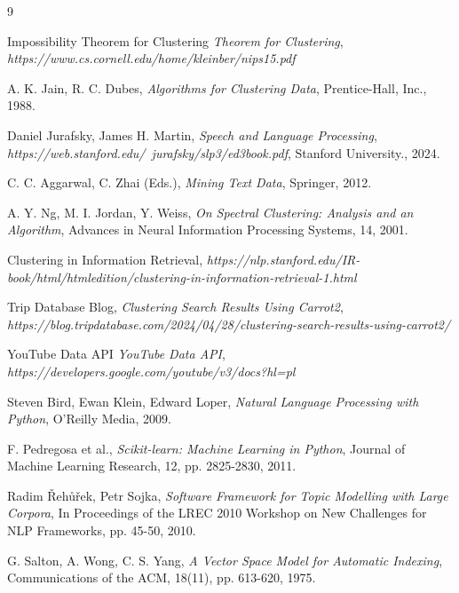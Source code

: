 \begin{thebibliography}{9}
\small


Impossibility Theorem for Clustering
\emph{Theorem for Clustering}, \emph{https://www.cs.cornell.edu/home/kleinber/nips15.pdf}

A. K. Jain, R. C. Dubes, \emph{Algorithms for Clustering Data}, Prentice-Hall, Inc., 1988.

Daniel Jurafsky, James H. Martin, 
\emph{Speech and Language Processing}, \emph{https://web.stanford.edu/~jurafsky/slp3/ed3book.pdf},
Stanford University., 2024.

C. C. Aggarwal, C. Zhai (Eds.), \emph{Mining Text Data}, Springer, 2012.

A. Y. Ng, M. I. Jordan, Y. Weiss, \emph{On Spectral Clustering: Analysis and an Algorithm}, Advances in Neural Information Processing Systems, 14, 2001.

Clustering in Information Retrieval, \emph{https://nlp.stanford.edu/IR-book/html/htmledition/clustering-in-information-retrieval-1.html}

Trip Database Blog, \emph{Clustering Search Results Using Carrot2}, \emph{https://blog.tripdatabase.com/2024/04/28/clustering-search-results-using-carrot2/}


YouTube Data API \emph{YouTube Data API}, \emph{https://developers.google.com/youtube/v3/docs?hl=pl}

Steven Bird, Ewan Klein, Edward Loper, \emph{Natural Language Processing with Python}, O'Reilly Media, 2009.

F. Pedregosa et al., \emph{Scikit-learn: Machine Learning in Python}, Journal of Machine Learning Research, 12, pp. 2825-2830, 2011.

Radim Řehůřek, Petr Sojka, \emph{Software Framework for Topic Modelling with Large Corpora}, In Proceedings of the LREC 2010 Workshop on New Challenges for NLP Frameworks, pp. 45-50, 2010.

G. Salton, A. Wong, C. S. Yang, \emph{A Vector Space Model for Automatic Indexing}, Communications of the ACM, 18(11), pp. 613-620, 1975.


\end{thebibliography}

